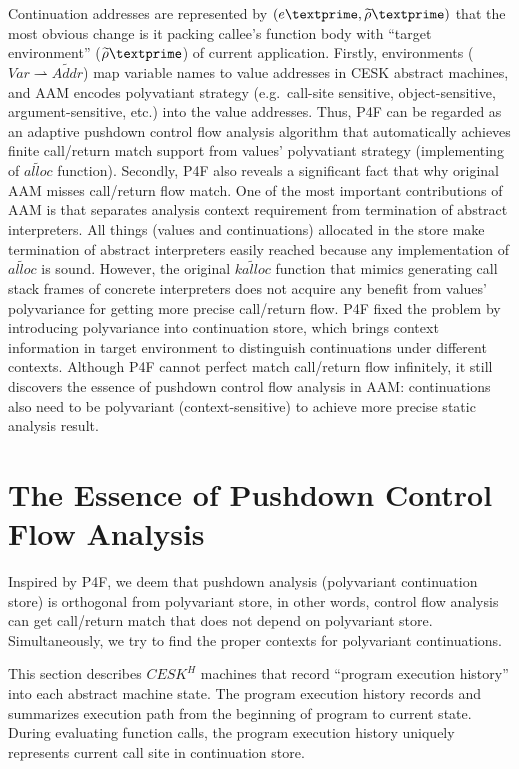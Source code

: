 \documentclass{article}
\begin{document}
Continuation addresses are represented by $(e\textprime, \widetilde{\rho}\textprime)$ that the most obvious change is it packing callee's function body with ``target environment'' ($\widetilde{\rho}\textprime$) of current application.
Firstly, environments ($Var \rightharpoonup \widetilde{Addr}$) map variable names to value addresses in CESK abstract machines, and AAM encodes polyvatiant strategy (e.g.\ call-site sensitive, object-sensitive, argument-sensitive, etc.) into the value addresses. Thus, P4F can be regarded as an adaptive pushdown control flow analysis algorithm that automatically achieves finite call/return match support from values' polyvatiant strategy (implementing of $\widetilde{alloc}$ function).
Secondly, P4F also reveals a significant fact that why original AAM misses call/return flow match. One of the most important contributions of AAM is that separates analysis context requirement from termination of abstract interpreters. All things (values and continuations) allocated in the store make termination of abstract interpreters easily reached because any implementation of $\widetilde{alloc}$ is sound.
However, the original $\widetilde{kalloc}$ function that mimics generating call stack frames of concrete interpreters does not acquire any benefit from values' polyvariance for getting more precise call/return flow. P4F fixed the problem by introducing polyvariance into continuation store, which brings context information in target environment to distinguish continuations under different contexts. Although P4F cannot perfect match call/return flow infinitely, it still discovers the essence of pushdown control flow analysis in AAM\@: continuations also need to be polyvariant (context-sensitive) to achieve more precise static analysis result.

\section{The Essence of Pushdown Control Flow Analysis}
\label{sec:The Essence of Pushdown Control Flow Analysis}
Inspired by P4F, we deem that pushdown analysis (polyvariant continuation store) is orthogonal from polyvariant store, in other words, control flow analysis can get call/return match that does not depend on polyvariant store. Simultaneously, we try to find the proper contexts for polyvariant continuations.

This section describes $CESK^H$ machines that record ``program execution history'' into each abstract machine state.
The program execution history records and summarizes execution path from the beginning of program to current state.
During evaluating function calls, the program execution history uniquely represents current call site in continuation store.
\end{document}
